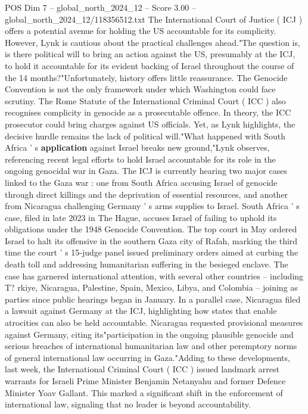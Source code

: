 \begin{textsample}{POS Dim 7 – global\_north\_2024\_12 – Score 3.00 – global\_north\_2024\_12/118356512.txt}
The International Court of Justice ( ICJ ) offers a potential avenue for holding the US accountable for its complicity.
However, Lynk is cautious about the practical challenges ahead."The question is, is there political will to bring an action against the US, presumably at the ICJ, to hold it accountable for its evident backing of Israel throughout the course of the 14 months?"Unfortunately, history offers little reassurance.
The Genocide Convention is not the only framework under which Washington could face scrutiny.
The Rome Statute of the International Criminal Court ( ICC ) also recognises complicity in genocide as a prosecutable offence.
In theory, the ICC prosecutor could bring charges against US officials.
Yet, as Lynk highlights, the decisive hurdle remains the lack of political will."What happened with South Africa ' s \textbf{application} against Israel breaks new ground,"Lynk observes, referencing recent legal efforts to hold Israel accountable for its role in the ongoing genocidal war in Gaza.
The ICJ is currently hearing two major cases linked to the Gaza war : one from South Africa accusing Israel of genocide through direct killings and the deprivation of essential resources, and another from Nicaragua challenging Germany ' s arms supplies to Israel.
South Africa ' s case, filed in late 2023 in The Hague, accuses Israel of failing to uphold its obligations under the 1948 Genocide Convention.
The top court in May ordered Israel to halt its offensive in the southern Gaza city of Rafah, marking the third time the court ' s 15-judge panel issued preliminary orders aimed at curbing the death toll and addressing humanitarian suffering in the besieged enclave.
The case has garnered international attention, with several other countries -- including T? rkiye, Nicaragua, Palestine, Spain, Mexico, Libya, and Colombia -- joining as parties since public hearings began in January.
In a parallel case, Nicaragua filed a lawsuit against Germany at the ICJ, highlighting how states that enable atrocities can also be held accountable.
Nicaragua requested provisional measures against Germany, citing its"participation in the ongoing plausible genocide and serious breaches of international humanitarian law and other peremptory norms of general international law occurring in Gaza."Adding to these developments, last week, the International Criminal Court ( ICC ) issued landmark arrest warrants for Israeli Prime Minister Benjamin Netanyahu and former Defence Minister Yoav Gallant.
This marked a significant shift in the enforcement of international law, signaling that no leader is beyond accountability.

\end{textsample}
